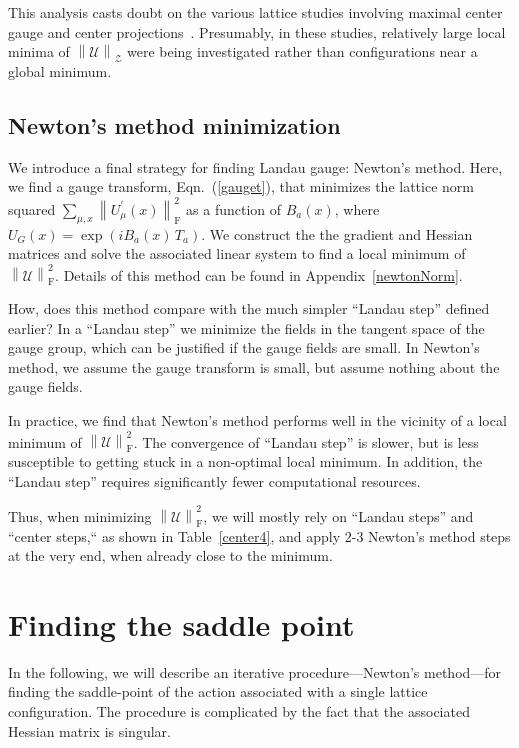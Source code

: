 \documentclass[preprint,aps,prd]{revtex4-2}
\newcommand{\zentrum}{\mathcal{Z}}       %
\newcommand{\config}{\mathcal{U}}
\newcommand\fnorm[1]{\left\lVert #1 \right\rVert_\mathrm{F}}
\newcommand\znorm[1]{\left\lVert #1 \right\rVert_\zentrum}
\begin{document}
This analysis casts doubt on the various lattice studies involving
maximal center gauge and center projections~\cite{
del_debbio_center_1997,del_debbio_detection_1998,de_forcrand_relevance_1999}.
Presumably, in these studies, relatively large local minima of
$\znorm{\config}$ were being investigated
rather than configurations near a global minimum.


\subsection{Newton's method minimization}

We introduce a final strategy for finding Landau gauge:
Newton's method.  Here, we find a gauge transform, Eqn.~(\ref{gauget}),
that minimizes the lattice norm squared $\sum_{\mu,x}\fnorm{U_\mu^\prime(x)}^2$
as a function of $B_a(x)$,
where $U_G(x) = \exp\left(i B_a(x)\, T_a\right)$.
We construct the the gradient and Hessian matrices
and solve the associated linear system to find a local minimum of
$\fnorm{\config}^2$.
Details of this method can be found in Appendix~\ref{newtonNorm}.

How, does this method compare with the much simpler ``Landau step'' defined
earlier?  In a ``Landau step'' we minimize the fields in the tangent space
of the gauge group, which can be justified if the gauge fields are small.
In Newton's method, we assume the gauge transform is small, but
assume nothing about the gauge fields.

In practice, we find that Newton's method performs well in the
vicinity of a local minimum of $\fnorm{\config}^2$.
The convergence of ``Landau step'' is slower, but is less susceptible
to getting stuck in a non-optimal local minimum.  In addition,
the ``Landau step'' requires significantly fewer computational resources.

Thus, when minimizing $\fnorm{\config}^2$, we will mostly rely
on ``Landau steps'' and ``center steps,`` as shown in Table~\ref{center4},
and apply 2-3 Newton's method steps at the very end,
when already close to the minimum.

\section{Finding the saddle point}

In the following, we will describe an iterative
procedure---Newton's method---for finding the saddle-point
of the action associated with a single lattice configuration.
The procedure is complicated by the fact that the associated
Hessian matrix is singular.
\end{document}
